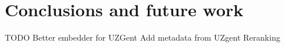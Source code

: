 
\chapter{Conclusions and future work}
\label{sec:conclusion_future_work}
TODO
Better embedder for UZGent
Add metadata from UZgent
Reranking